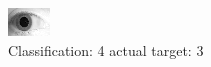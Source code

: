 \begin{figure}[h!]
\begin{center}
\includegraphics[width=0.60\columnwidth]{figures/ID1981_class_4_target_3.png}
\end{center}
\caption{ Classification: 4 actual target: 3}
\label{fig:ID1981_class_4_target_3}
\end{figure}
